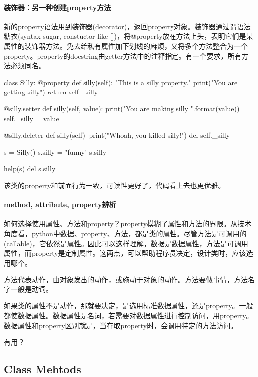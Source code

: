 \paragraph{装饰器：另一种创建property方法}
新的property语法用到装饰器(decorator)，返回property对象。装饰器通过谓语法糖衣(syntax sugar, constuctor like [])，将@property放在方法上头，表明它们是某属性的装饰器方法。免去给私有属性加下划线的麻烦，又将多个方法整合为一个property。property的docstring由getter方法中的注释指定。有一个要求，所有方法必须同名。
\begin{python}
class Silly:
    @property
    def silly(self):
        "This is a silly property."
        print("You are getting silly")
        return self._silly

    @silly.setter
    def silly(self, value):
        print("You are making silly {}".format(value))
        self._silly = value

    @silly.deleter
    def silly(self):
        print("Whoah, you killed silly!")
        del self._silly

s = Silly()
s.silly = "funny"
s.silly

help(s)
del s.silly
\end{python}

该类的property和前面行为一致，可读性更好了，代码看上去也更优雅。

\paragraph{method, attribute, property辨析}
如何选择使用属性、方法和property？property模糊了属性和方法的界限。从技术角度看，python中数据、property、方法，都是类的属性。尽管方法是可调用的(callable)，它依然是属性。因此可以这样理解，数据是数据属性，方法是可调用属性，而property是定制属性。这两点，可以帮助程序员决定，设计类时，应该选用哪个。

方法代表动作，由对象发出的动作，或施动于对象的动作。方法要做事情，方法名字一般是动词。

如果类的属性不是动作，那就要决定，是选用标准数据属性，还是property。一般都使数据属性。数据属性是名词，若需要对数据属性进行控制访问，用property。数据属性和property区别就是，当存取property时，会调用特定的方法访问。

有用？

\subsection{Class Mehtods}

